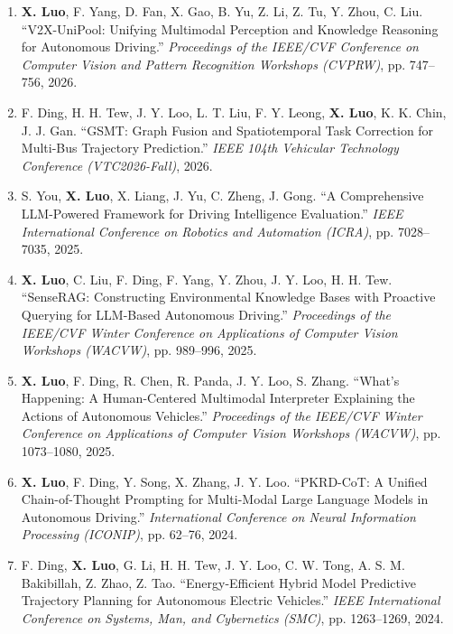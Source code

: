 \documentclass[letterpaper,11pt]{article}
\begin{document}
\begin{justifying}
\begin{enumerate}

\item \textbf{X. Luo}, F. Yang, D. Fan, X. Gao, B. Yu, Z. Li, Z. Tu, Y. Zhou, C. Liu. “V2X-UniPool: Unifying Multimodal Perception and Knowledge Reasoning for Autonomous Driving.” \textit{Proceedings of the IEEE/CVF Conference on Computer Vision and Pattern Recognition Workshops (CVPRW)}, pp. 747–756, 2026.

\item F. Ding, H. H. Tew, J. Y. Loo, L. T. Liu, F. Y. Leong, \textbf{X. Luo}, K. K. Chin, J. J. Gan. “GSMT: Graph Fusion and Spatiotemporal Task Correction for Multi-Bus Trajectory Prediction.” \textit{IEEE 104th Vehicular Technology Conference (VTC2026-Fall)}, 2026.

\item S. You, \textbf{X. Luo}, X. Liang, J. Yu, C. Zheng, J. Gong. “A Comprehensive LLM-Powered Framework for Driving Intelligence Evaluation.” \textit{IEEE International Conference on Robotics and Automation (ICRA)}, pp. 7028–7035, 2025.

\item \textbf{X. Luo}, C. Liu, F. Ding, F. Yang, Y. Zhou, J. Y. Loo, H. H. Tew. “SenseRAG: Constructing Environmental Knowledge Bases with Proactive Querying for LLM-Based Autonomous Driving.” \textit{Proceedings of the IEEE/CVF Winter Conference on Applications of Computer Vision Workshops (WACVW)}, pp. 989–996, 2025.

\item \textbf{X. Luo}, F. Ding, R. Chen, R. Panda, J. Y. Loo, S. Zhang. “What’s Happening: A Human-Centered Multimodal Interpreter Explaining the Actions of Autonomous Vehicles.” \textit{Proceedings of the IEEE/CVF Winter Conference on Applications of Computer Vision Workshops (WACVW)}, pp. 1073–1080, 2025.

\item \textbf{X. Luo}, F. Ding, Y. Song, X. Zhang, J. Y. Loo. “PKRD-CoT: A Unified Chain-of-Thought Prompting for Multi-Modal Large Language Models in Autonomous Driving.” \textit{International Conference on Neural Information Processing (ICONIP)}, pp. 62–76, 2024.

\item F. Ding, \textbf{X. Luo}, G. Li, H. H. Tew, J. Y. Loo, C. W. Tong, A. S. M. Bakibillah, Z. Zhao, Z. Tao. “Energy-Efficient Hybrid Model Predictive Trajectory Planning for Autonomous Electric Vehicles.” \textit{IEEE International Conference on Systems, Man, and Cybernetics (SMC)}, pp. 1263–1269, 2024.


\end{enumerate}
\end{justifying}
\end{document}

